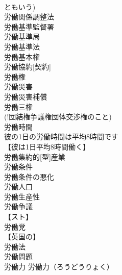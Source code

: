 \documentclass[8pt]{extreport}
\begin{document}
\begin{CJK}{UTF8}{min}
\\	ともいう)
\\	労働関係調整法
\\	労働基準監督署
\\	労働基準局
\\	労働基準法
\\	労働基本権
\\	労働協約[契約]
\\	労働権
\\	労働災害
\\	労働災害補償
\\	労働三権
\\	(!団結権争議権団体交渉権のこと)
\\	労働時間
\\	彼の1日の労働時間は平均8時間です
\\	【彼は1日平均8時間働く】
\\	労働集約的[型]産業
\\	労働条件
\\	労働条件の悪化
\\	労働人口
\\	労働生産性
\\	労働争議
\\	【スト】
\\	労働党
\\	【英国の】
\\	労働法
\\	労働問題
\\	労働力		労働力（ろうどうりょく）
\end{CJK}
\end{document}
